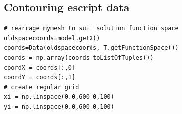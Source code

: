\subsection{Contouring escript data}
\begin{verbatim}
# rearrage mymesh to suit solution function space      
oldspacecoords=model.getX()
coords=Data(oldspacecoords, T.getFunctionSpace())
coords = np.array(coords.toListOfTuples())
coordX = coords[:,0]
coordY = coords[:,1]
# create regular grid
xi = np.linspace(0.0,600.0,100)
yi = np.linspace(0.0,600.0,100)
\end{verbatim}

